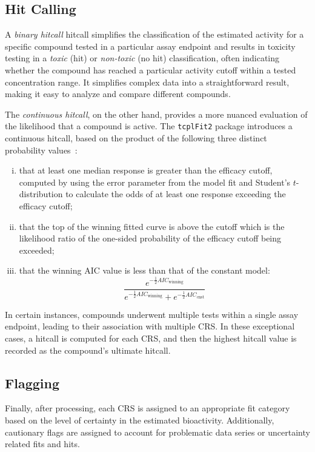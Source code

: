 \subsection{Hit Calling}
A \emph{binary hitcall} hitcall simplifies the classification of the estimated activity for a specific compound tested in a particular assay endpoint and results in toxicity testing in a \emph{toxic} (hit) or \emph{non-toxic} (no hit) classification, often indicating whether the compound has reached a particular activity cutoff within a tested concentration range. It simplifies complex data into a straightforward result, making it easy to analyze and compare different compounds.

The \emph{continuous hitcall}, on the other hand, provides a more nuanced evaluation of the likelihood that a compound is active. The \texttt{tcplFit2} package introduces a continuous hitcall, based on the product of the following three distinct probability values~\cite{sheffield2021}:

\begin{enumerate}[i.]
    \item that at least one median response is greater than the efficacy cutoff, computed by using the error parameter from the model fit and Student's $t$-distribution to calculate the odds of at least one response exceeding the efficacy cutoff;
    \item that the top of the winning fitted curve is above the cutoff which is the likelihood ratio of the one-sided probability of the efficacy cutoff being exceeded;
    \item that the winning AIC value is less than that of the constant model:
    \begin{equation}
    \frac{e^{-\frac{1}{2}AIC_{\text{winning}}}}{e^{-\frac{1}{2}AIC_{\text{winning}}} + e^{-\frac{1}{2}AIC_{\text{cnst}}} }
    \end{equation}
\end{enumerate}

In certain instances, compounds underwent multiple tests within a single assay endpoint, leading to their association with multiple CRS. In these exceptional cases, a hitcall is computed for each CRS, and then the highest hitcall value is recorded as the compound's ultimate hitcall.

\subsection{Flagging}
Finally, after processing, each CRS is assigned to an appropriate fit category based on the level of certainty in the estimated bioactivity. Additionally, cautionary flags are assigned to account for problematic data series or uncertainty related fits and hits.


